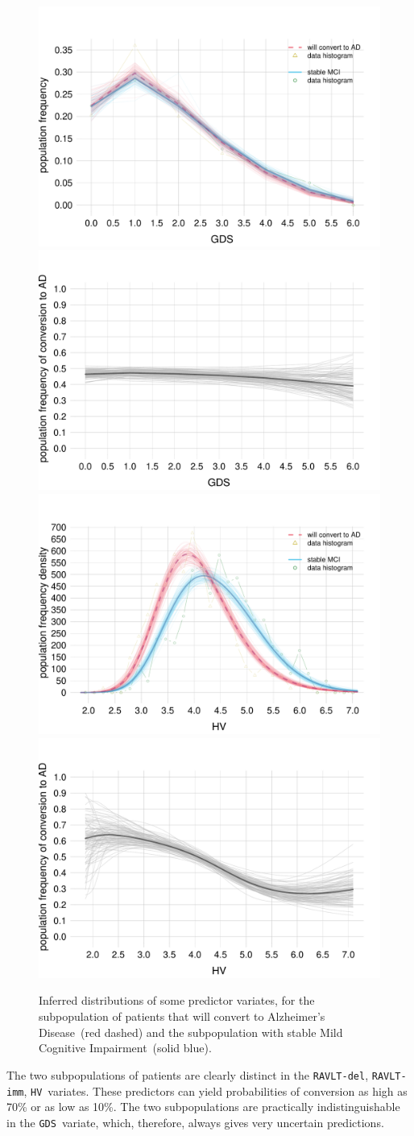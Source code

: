 \documentclass[utf8]{FrontiersinHarvard_mod} %
\renewcommand*{\|}[1][]{\nonscript\:#1\vert\nonscript\:\mathopen{}}
\newcommand*{\hv}{\texttt{HV}}
\newcommand*{\gds}{\texttt{GDS}}
\newcommand*{\ravltimm}{\texttt{RAVLT-imm}}
\newcommand*{\ravltdel}{\texttt{RAVLT-del}}
\newcommand*{\ad}{Alzheimer's Disease}
\newcommand*{\mci}{Mild Cognitive Impairment}
\begin{document}
\begin{figure}[!t]
\\
\includegraphics[width=0.43\linewidth]{population_distr_scat_GDS.pdf}%
\qquad%
\includegraphics[width=0.43\linewidth]{prob_conversion_GDS.pdf}%
\\
\includegraphics[width=0.43\linewidth]{population_distr_scat_HV.pdf}%
\qquad%
\includegraphics[width=0.43\linewidth]{prob_conversion_HV.pdf}%
\caption{Inferred distributions of some predictor variates, for the subpopulation of patients that will convert to \ad\ (\textcolor{redpurple}{red dashed}) and the subpopulation with stable \mci\ (\textcolor{bluepurple}{solid blue}).}\label{fig:marginal_pop_distributions}
\end{figure}%
%
The two subpopulations of patients are clearly distinct in the \ravltdel, \ravltimm, \hv\ variates. These predictors can yield probabilities of conversion as high as 70\% or as low as 10\%. The two subpopulations are practically indistinguishable in the \gds\ variate, which, therefore, always gives very uncertain predictions.
\end{document}
